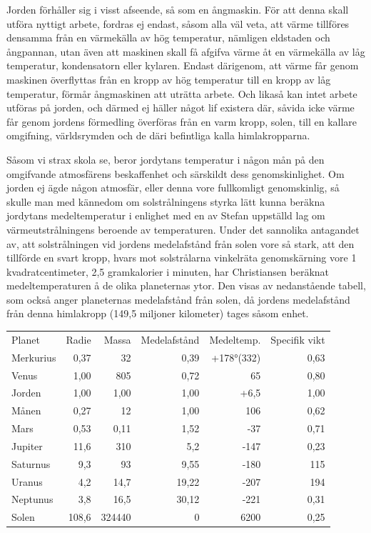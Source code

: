 \documentclass[a4paper, 12pt, oneside, swedish]{article}
\begin{document}
Jorden förhåller sig i visst afseende, så som en ångmaskin. För att denna skall utföra nyttigt arbete, fordras ej endast, såsom alla väl veta, att värme tillföres densamma från en värmekälla av hög temperatur, nämligen eldstaden och ångpannan, utan även att maskinen skall få afgifva värme åt en värmekälla av låg temperatur, kondensatorn eller kylaren. Endast därigenom, att värme får genom maskinen överflyttas från en kropp av hög temperatur till en kropp av låg temperatur, förmår ångmaskinen att uträtta arbete. Och likaså kan intet arbete utföras på jorden, och därmed ej häller något lif existera där, såvida icke värme får genom jordens förmedling överföras från en varm kropp, solen, till en kallare omgifning, världsrymden och de däri befintliga kalla himlakropparna.

Såsom vi strax skola se, beror jordytans temperatur i någon mån på den omgifvande atmosfärens beskaffenhet och särskildt dess genomskinlighet. Om jorden ej ägde någon atmosfär, eller denna vore fullkomligt genomskinlig, så skulle man med kännedom om solstrålningens styrka lätt kunna beräkna jordytans medeltemperatur i enlighet med en av Stefan uppställd lag om värmeutstrålningens beroende av temperaturen. Under det sannolika antagandet av, att solstrålningen vid jordens medelafstånd från solen vore så stark, att den tillförde en svart kropp, hvars mot solstrålarna vinkelräta genomskärning vore 1 kvadratcentimeter, 2,5 gramkalorier i minuten, har Christiansen beräknat medeltemperaturen å de olika planeternas ytor. Den visas av nedanstående tabell, som också anger planeternas medelafstånd från solen, då jordens medelafstånd från denna himlakropp (149,5 miljoner kilometer) tages såsom enhet.

\begin{table}[H]
    \centering
    \footnotesize
    \Fontauri
    \begin{tabular}{l r r r r r}
        Planet & Radie & Massa & Medelafstånd & Medeltemp. & Specifik vikt   \\
        Merkurius & 0,37 & 32 & 0,39 & +178°(332) & 0,63   \\
        Venus & 1,00 & 805 & 0,72 & 65 & 0,80   \\
        Jorden & 1,00 & 1,00 & 1,00 & +6,5 & 1,00   \\
        Månen & 0,27 & 12 & 1,00 & 106 & 0,62   \\
        Mars & 0,53 & 0,11 & 1,52 & -37 & 0,71   \\
        Jupiter & 11,6 & 310 & 5,2 & -147 & 0,23   \\
        Saturnus & 9,3 & 93 & 9,55 & -180 & 115 \\
        Uranus & 4,2 & 14,7 & 19,22 & -207 & 194 \\
        Neptunus & 3,8 & 16,5 & 30,12 & -221 & 0,31   \\
        Solen & 108,6 & 324440 & 0 & 6200 & 0,25 \\
    \end{tabular}
\end{table}
\end{document}
